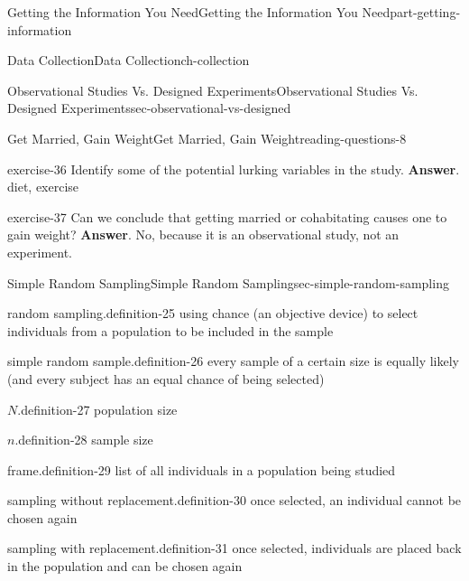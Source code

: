 \documentclass[oneside,10pt,]{book}
\numberwithin{equation}{section}
\begin{document}
\begin{partptx}{Getting the Information You Need}{}{Getting the Information You Need}{}{}{part-getting-information}
\begin{chapterptx}{Data Collection}{}{Data Collection}{}{}{ch-collection}
\begin{sectionptx}{Observational Studies Vs. Designed Experiments}{}{Observational Studies Vs. Designed Experiments}{}{}{sec-observational-vs-designed}
\begin{reading-questions-subsection-numberless}{Get Married, Gain Weight}{}{Get Married, Gain Weight}{}{}{reading-questions-8}
\begin{divisionexercise}{3}{}{}{exercise-36}%
Identify some of the potential lurking variables in the study. \textbf{Answer}.\hypertarget{answer-36}{}\quad%
diet, exercise\end{divisionexercise}%
\begin{divisionexercise}{4}{}{}{exercise-37}%
Can we conclude that getting married or cohabitating causes one to gain weight? \textbf{Answer}.\hypertarget{answer-37}{}\quad%
No, because it is an observational study, not an experiment.\end{divisionexercise}%
\end{reading-questions-subsection-numberless}
\end{sectionptx}
%
%
\typeout{************************************************}
\typeout{************************************************}
%
\begin{sectionptx}{Simple Random Sampling}{}{Simple Random Sampling}{}{}{sec-simple-random-sampling}
\begin{definition}{random sampling.}{definition-25}%
using chance (an objective device) to select individuals from a population to be included in the sample\end{definition}
\begin{definition}{simple random sample.}{definition-26}%
every sample of a certain size is equally likely (and every subject has an equal chance of being selected)\end{definition}
\begin{definition}{\(N\).}{definition-27}%
population size\end{definition}
\begin{definition}{\(n\).}{definition-28}%
sample size\end{definition}
\begin{definition}{frame.}{definition-29}%
list of all individuals in a population being studied\end{definition}
\begin{definition}{sampling without replacement.}{definition-30}%
once selected, an individual cannot be chosen again\end{definition}
\begin{definition}{sampling with replacement.}{definition-31}%
once selected, individuals are placed back in the population and can be chosen again\end{definition}
%
%
\typeout{************************************************}

\end{sectionptx}
\end{chapterptx}
\end{partptx}
\end{document}

